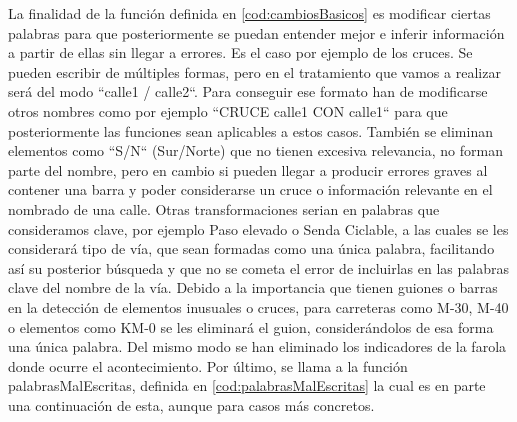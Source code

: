 




La finalidad de la función definida en \ref{cod:cambiosBasicos} es modificar ciertas palabras para que posteriormente se puedan entender mejor e inferir información a partir de ellas sin llegar a errores.
\newline
Es el caso por ejemplo de los cruces. Se pueden escribir de múltiples formas, pero en el tratamiento que vamos a realizar será del modo ``calle1 / calle2``. Para conseguir ese formato han de modificarse otros nombres como por ejemplo ``CRUCE calle1 CON calle1`` para que posteriormente las funciones sean aplicables a estos casos.
\newline
También se eliminan elementos como ``S/N`` (Sur/Norte) que no tienen excesiva relevancia, no forman parte del nombre, pero en cambio si pueden llegar a producir errores graves al contener una barra y poder considerarse un cruce o información relevante en el nombrado de una calle.
\newline
Otras transformaciones serian en palabras que consideramos clave, por ejemplo Paso elevado o Senda Ciclable, a las cuales se les considerará tipo de vía, que sean formadas como una única palabra, facilitando así su posterior búsqueda y que no se cometa el error de incluirlas en las palabras clave del nombre de la vía.
\newline
Debido a la importancia que tienen guiones o barras en la detección de elementos inusuales o cruces, para carreteras como M-30, M-40 o elementos como KM-0 se les eliminará el guion, considerándolos de esa forma una única palabra. Del mismo modo se han eliminado los indicadores de la farola donde ocurre el acontecimiento.
\newline
Por último, se llama a la función palabrasMalEscritas, definida en \ref{cod:palabrasMalEscritas} la cual es en parte una continuación de esta, aunque para casos más concretos.

\clearpage


